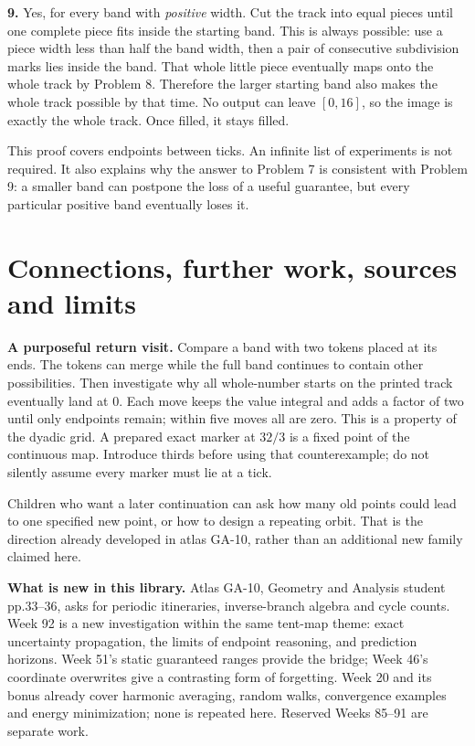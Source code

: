 \documentclass[11pt,letterpaper]{article}
\begin{document}
\textbf{9.} Yes, for every band with \emph{positive} width. Cut the track into equal pieces until one complete piece fits inside the starting band. This is always possible: use a piece width less than half the band width, then a pair of consecutive subdivision marks lies inside the band. That whole little piece eventually maps onto the whole track by Problem 8. Therefore the larger starting band also makes the whole track possible by that time. No output can leave $[0,16]$, so the image is exactly the whole track. Once filled, it stays filled.

This proof covers endpoints between ticks. An infinite list of experiments is not required. It also explains why the answer to Problem 7 is consistent with Problem 9: a smaller band can postpone the loss of a useful guarantee, but every particular positive band eventually loses it.
\newpage
\section*{Connections, further work, sources and limits}
\textbf{A purposeful return visit.} Compare a band with two tokens placed at its ends. The tokens can merge while the full band continues to contain other possibilities. Then investigate why all whole-number starts on the printed track eventually land at $0$. Each move keeps the value integral and adds a factor of two until only endpoints remain; within five moves all are zero. This is a property of the dyadic grid. A prepared exact marker at $32/3$ is a fixed point of the continuous map. Introduce thirds before using that counterexample; do not silently assume every marker must lie at a tick.

Children who want a later continuation can ask how many old points could lead to one specified new point, or how to design a repeating orbit. That is the direction already developed in atlas GA-10, rather than an additional new family claimed here.

\textbf{What is new in this library.} Atlas GA-10, Geometry and Analysis student pp.33--36, asks for periodic itineraries, inverse-branch algebra and cycle counts. Week 92 is a new investigation within the same tent-map theme: exact uncertainty propagation, the limits of endpoint reasoning, and prediction horizons. Week 51's static guaranteed ranges provide the bridge; Week 46's coordinate overwrites give a contrasting form of forgetting. Week 20 and its bonus already cover harmonic averaging, random walks, convergence examples and energy minimization; none is repeated here. Reserved Weeks 85--91 are separate work.
\end{document}
